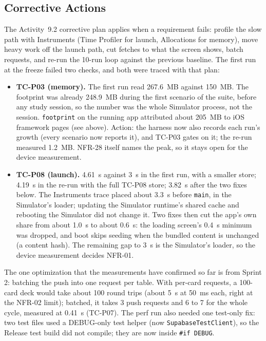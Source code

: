 \documentclass[12pt,letterpaper]{article}
\begin{document}
\subsection{Corrective Actions}
The Activity~9.2 corrective plan applies when a requirement fails: profile the slow
path with Instruments (Time Profiler for launch, Allocations for memory), move heavy
work off the launch path, cut fetches to what the screen shows, batch requests, and
re-run the 10-run loop against the previous baseline. The first run at the freeze
failed two checks, and both were traced with that plan:
\begin{itemize}
  \item \textbf{TC-P03 (memory).} The first run read 267.6~MB against 150~MB. The
        footprint was already 248.9~MB during the first scenario of the suite, before
        any study session, so the number was the whole Simulator process, not the
        session. \texttt{footprint} on the running app attributed about 205~MB to iOS
        framework pages (see above). Action: the harness now also records each run's
        growth (every scenario now reports it), and TC-P03 gates on it; the re-run
        measured 1.2~MB. NFR-28 itself names the peak, so it stays open for the
        device measurement.
  \item \textbf{TC-P08 (launch).} 4.61~s against 3~s in the first run, with a smaller
        store; 4.19~s in the re-run with the full TC-P08 store; 3.82~s after the two
        fixes below. The Instruments trace placed
        about 3.3~s before \texttt{main}, in the Simulator's loader; updating the
        Simulator runtime's shared cache and rebooting the Simulator did not change
        it. Two fixes then cut the app's own share from about 1.0~s to about 0.6~s:
        the loading screen's 0.4~s minimum was dropped, and boot skips seeding when
        the bundled content is unchanged (a content hash). The remaining gap to 3~s
        is the Simulator's loader, so the device measurement decides NFR-01.
\end{itemize}
The one optimization that the measurements have confirmed so far is from Sprint 2:
batching the push into one request per table. With per-card requests, a 100-card
deck would take about 100 round trips (about 5~s at 50~ms each, right at the NFR-02
limit); batched, it takes 3 push requests and 6 to 7 for the whole cycle, measured at
0.41~s (TC-P07). The perf run also needed one test-only fix: two test files used a DEBUG-only test
helper (now \texttt{SupabaseTestClient}), so the Release test build did not compile;
they are now inside \texttt{\#if DEBUG}.
\end{document}
